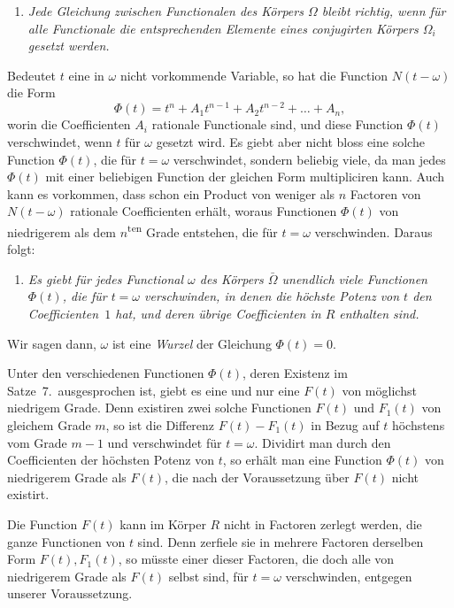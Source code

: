 \documentclass[12pt,a4paper]{article}
\theoremstyle{definition}
\begin{document}
\begin{enumerate}[label=\arabic*., resume]
\item \textit{Jede Gleichung zwischen Functionalen des Körpers $\Omega$ bleibt richtig, wenn für alle Functionale die entsprechenden Elemente eines conjugirten Körpers $\Omega_i$ gesetzt werden.}
\end{enumerate}

Bedeutet $t$ eine in $\omega$ nicht vorkommende Variable, so hat die Function $N(t-\omega)$ die Form
\begin{equation}\label{eq:136-5}
\Phi(t) = t^n + A_1t^{n-1} + A_2t^{n-2} + \dots + A_n,
\end{equation}
worin die Coefficienten $A_i$ rationale Functionale sind, und diese Function $\Phi(t)$ verschwindet, wenn $t$ für $\omega$ gesetzt wird. Es giebt aber nicht bloss eine solche Function $\Phi(t)$, die für $t=\omega$ verschwindet, sondern beliebig viele, da man jedes $\Phi(t)$ mit einer beliebigen Function der gleichen Form multipliciren kann. Auch kann es vorkommen, dass schon ein Product von weniger als $n$ Factoren von $N(t-\omega)$ rationale Coefficienten erhält, woraus Functionen $\Phi(t)$ von niedrigerem als dem $n$\textsuperscript{ten} Grade entstehen, die für $t=\omega$ verschwinden. Daraus folgt:

\begin{enumerate}[label=\arabic*., resume]
\item \textit{Es giebt für jedes Functional $\omega$ des Körpers $\bar{\Omega}$ unendlich viele Functionen $\Phi(t)$, die für $t=\omega$ verschwinden, in denen die höchste Potenz von $t$ den Coefficienten~$1$ hat, und deren übrige Coefficienten in $R$ enthalten sind.}
\end{enumerate}

Wir sagen dann, $\omega$ ist eine \emph{Wurzel} der Gleichung $\Phi(t)=0$.

Unter den verschiedenen Functionen $\Phi(t)$, deren Existenz im Satze~7.\ ausgesprochen ist, giebt es eine und nur eine $F(t)$ von möglichst niedrigem Grade. Denn existiren zwei solche Functionen $F(t)$ und $F_1(t)$ von gleichem Grade $m$, so ist die Differenz $F(t)-F_1(t)$ in Bezug auf $t$ höchstens vom Grade $m-1$ und verschwindet für $t=\omega$. Dividirt man durch den Coefficienten der höchsten Potenz von $t$, so erhält man eine Function $\Phi(t)$ von niedrigerem Grade als $F(t)$, die nach der Voraussetzung über $F(t)$ nicht existirt.

Die Function $F(t)$ kann im Körper $R$ nicht in Factoren zerlegt werden, die ganze Functionen von $t$ sind. Denn zerfiele sie in mehrere Factoren derselben Form $F(t),F_1(t)$, so müsste einer dieser Factoren, die doch alle von niedrigerem Grade als $F(t)$ selbst sind, für $t=\omega$ verschwinden, entgegen unserer Voraussetzung.
\end{document}
